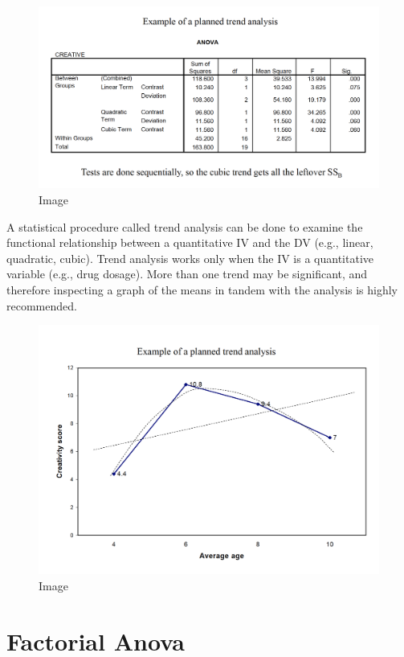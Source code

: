 \documentclass[]{book}
\theoremstyle{definition}
\theoremstyle{definition}
\theoremstyle{definition}
\theoremstyle{remark}
\begin{document}
\begin{figure}
\centering
\includegraphics{img/hicksphc25.png}
\caption{Image}
\end{figure}

A statistical procedure called trend analysis can be done to examine the
functional relationship between a quantitative IV and the DV (e.g.,
linear, quadratic, cubic). Trend analysis works only when the IV is a
quantitative variable (e.g., drug dosage). More than one trend may be
significant, and therefore inspecting a graph of the means in tandem
with the analysis is highly recommended.

\begin{figure}
\centering
\includegraphics{img/hicksphc26.png}
\caption{Image}
\end{figure}

\chapter{Factorial Anova}\label{factorial-anova}
\end{document}
